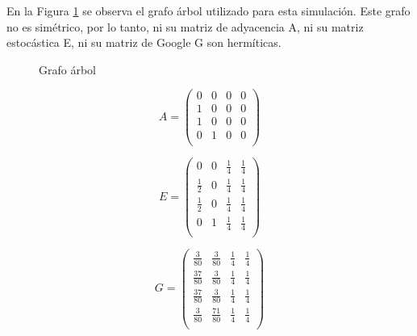 En la Figura \ref{fig:tree} se observa el grafo árbol utilizado para esta simulación. Este grafo no es simétrico, por lo tanto, ni su matriz de adyacencia A, ni su matriz estocástica E, ni su matriz de Google G son hermíticas.

\begin{figure}[H]
    \centering
    \caption[Grafo árbol]{Grafo árbol}
    \label{fig:tree}
\end{figure}

\begin{equation}
    A = 
    \begin{pmatrix}
        0 & 0 & 0 & 0 \\
        1 & 0 & 0 & 0 \\
        1 & 0 & 0 & 0 \\
        0 & 1 & 0 & 0 \\
    \end{pmatrix}
\end{equation}

\begin{equation}
    E =
    \begin{pmatrix}
        0 & 0 & \frac{1}{4} & \frac{1}{4} \\
        \frac{1}{2} & 0 & \frac{1}{4} & \frac{1}{4} \\
        \frac{1}{2} & 0 & \frac{1}{4} & \frac{1}{4} \\
        0 & 1 & \frac{1}{4} & \frac{1}{4} \\
    \end{pmatrix}
\end{equation}

\begin{equation}
    G =
    \begin{pmatrix}
        \frac{3}{80} & \frac{3}{80} & \frac{1}{4} & \frac{1}{4} \\
        \frac{37}{80} & \frac{3}{80} & \frac{1}{4} & \frac{1}{4} \\
        \frac{37}{80} & \frac{3}{80} & \frac{1}{4} & \frac{1}{4} \\
        \frac{3}{80} & \frac{71}{80} & \frac{1}{4} & \frac{1}{4} \\
    \end{pmatrix}
\end{equation}

